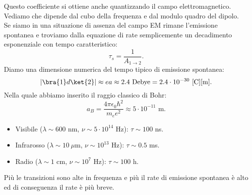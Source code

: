 Questo coefficiente si ottiene anche quantizzando il campo elettromagnetico.
Vediamo che dipende dal cubo della frequenza e dal modulo quadro del dipolo.\\
Se siamo in una situazione di assenza del campo EM rimane l'emissione spontanea e troviamo dalla equazione di rate semplicemente un decadimento esponenziale con tempo caratteristico:
\[
\tau_{s}=\frac{1}{A_{1\to 2}}
.\] 
Diamo una dimensione numerica del tempo tipico di emissione spontanea:
\[
    \left|\bra{1}d\ket{2}\right|\approx ea \approx 2.4 \text{ Debye} = 2.4\cdot 10^{-30}\text{ [C][m]}
.\] 
Nella quale abbiamo inserito il raggio classico di Bohr:
\[
    a_B = \frac{4\pi\epsilon_0\hbar ^2}{m_ee^2} \approx 5\cdot 10^{-11} \text{ m}
.\] 
\begin{itemize}
    \item Visibile ($\lambda\sim 600$ nm, $\nu  \sim 5\cdot 10^{14}$ Hz): $\tau\sim 100$ ns.
    \item Infrarosso ($\lambda\sim 10 \ \mu$m, $\nu\sim 10^{13}$ Hz): $\tau  \sim 0.5 $ ms.
    \item Radio ($\lambda  \sim 1$ cm, $\nu\sim 10^{7}$ Hz): $\tau\sim 100$ h.
\end{itemize}
Più le transizioni sono alte in frequenza e più il rate di emissione spontanea è alto ed di conseguenza il rate è più breve.
